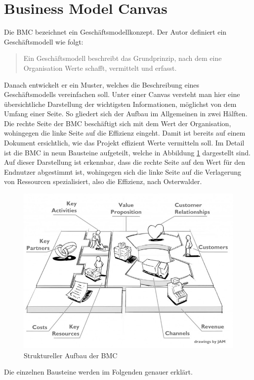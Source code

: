 \section{Business Model Canvas}
\label{BMC_Kapitel}
Die \ac{BMC} bezeichnet ein Geschäftsmodellkonzept. Der Autor definiert ein Geschäftsmodell wie folgt:
\begin{quote}
Ein Geschäftsmodell beschreibt das Grundprinzip, nach dem eine Organisation Werte schafft, vermittelt und erfasst.
\end{quote}
Danach entwickelt er ein Muster, welches die Beschreibung eines Geschäftsmodells vereinfachen soll. Unter einer Canvas versteht man hier eine übersichtliche Darstellung der wichtigsten Informationen, möglichst von dem Umfang einer Seite. So gliedert sich der Aufbau im Allgemeinen in zwei Hälften. Die rechte Seite der \ac{BMC} beschäftigt sich mit dem Wert der Organisation, wohingegen die linke Seite auf die Effizienz eingeht. Damit ist bereits auf einem Dokument ersichtlich, wie das Projekt effizient Werte vermitteln soll. Im Detail ist die \ac{BMC} in neun Bausteine aufgeteilt, welche in Abbildung \ref{fig:BMC_Structure} dargestellt sind. Auf dieser Darstellung ist erkennbar, dass die rechte Seite auf den Wert für den Endnutzer abgestimmt ist, wohingegen sich die linke Seite auf die Verlagerung von Ressourcen spezialisiert, also die Effizienz, nach Osterwalder. 
\begin{figure}
	\begin{center}
		\includegraphics[width=\textwidth/2]{99_IMG/02_Grundlagen/bmcStructure.jpg}
		\caption[Struktureller Aufbau der \ac{BMC}]{Struktureller Aufbau der \ac{BMC}\cite{Sammer2018}}
		\label{fig:BMC_Structure}
	\end{center}
\end{figure}
Die einzelnen Bausteine werden im Folgenden genauer erklärt.

